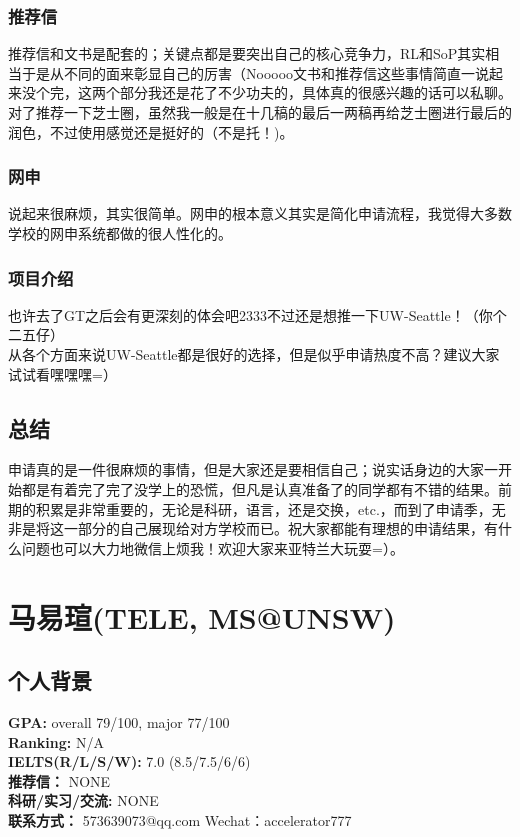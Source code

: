\documentclass[a4paper,UTF8]{book}
\begin{document}
        \subsubsection*{推荐信}
        推荐信和文书是配套的；关键点都是要突出自己的核心竞争力，RL和SoP其实相当于是从不同的面来彰显自己的厉害（Nooooo文书和推荐信这些事情简直一说起来没个完，这两个部分我还是花了不少功夫的，具体真的很感兴趣的话可以私聊。\\
        对了推荐一下芝士圈，虽然我一般是在十几稿的最后一两稿再给芝士圈进行最后的润色，不过使用感觉还是挺好的（不是托！)。

        \subsubsection*{网申}
        说起来很麻烦，其实很简单。网申的根本意义其实是简化申请流程，我觉得大多数学校的网申系统都做的很人性化的。

        \subsubsection*{项目介绍}
        也许去了GT之后会有更深刻的体会吧2333不过还是想推一下UW-Seattle！（你个二五仔）\\
        从各个方面来说UW-Seattle都是很好的选择，但是似乎申请热度不高？建议大家试试看嘿嘿嘿=） 

    \subsection*{总结}
    申请真的是一件很麻烦的事情，但是大家还是要相信自己；说实话身边的大家一开始都是有着完了完了没学上的恐慌，但凡是认真准备了的同学都有不错的结果。前期的积累是非常重要的，无论是科研，语言，还是交换，etc.，而到了申请季，无非是将这一部分的自己展现给对方学校而已。祝大家都能有理想的申请结果，有什么问题也可以大力地微信上烦我！欢迎大家来亚特兰大玩耍=）。

\clearpage
\section{马易瑄(TELE, MS@UNSW)}
    \subsection*{个人背景}
        \textbf{GPA:} overall 79/100, major 77/100\\
        \textbf{Ranking:} N/A\\
        \textbf{IELTS(R/L/S/W): }7.0 (8.5/7.5/6/6)\\
        \textbf{推荐信：} NONE\\
        \textbf{科研/实习/交流:} NONE\\ 
        \textbf{联系方式：} 573639073@qq.com  Wechat：accelerator777
\end{document}
